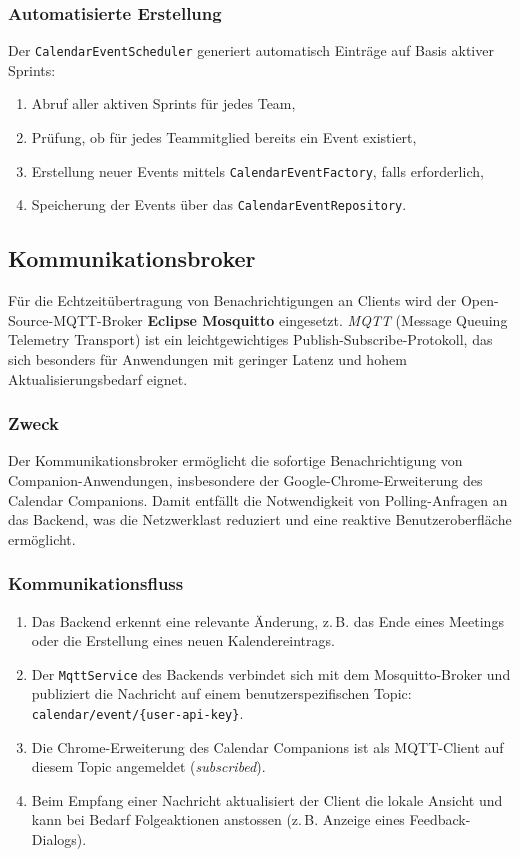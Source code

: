 \documentclass[12pt,a4paper]{report}
\begin{document}
    \subsubsection{Automatisierte Erstellung}
        Der \texttt{CalendarEventScheduler} generiert automatisch Einträge auf Basis aktiver Sprints:
        \begin{enumerate}
            \item Abruf aller aktiven Sprints für jedes Team,
            \item Prüfung, ob für jedes Teammitglied bereits ein Event existiert,
            \item Erstellung neuer Events mittels \texttt{CalendarEventFactory}, falls erforderlich,
            \item Speicherung der Events über das \texttt{CalendarEventRepository}.
        \end{enumerate}

\subsection{Kommunikationsbroker}
        Für die Echtzeitübertragung von Benachrichtigungen an Clients wird der Open-Source-MQTT-Broker \textbf{Eclipse Mosquitto} eingesetzt.
        \textit{MQTT} (Message Queuing Telemetry Transport) ist ein leichtgewichtiges Publish-Subscribe-Protokoll, das sich besonders für Anwendungen mit geringer Latenz und hohem Aktualisierungsbedarf eignet.

    \subsubsection{Zweck}
        Der Kommunikationsbroker ermöglicht die sofortige Benachrichtigung von Companion-Anwendungen, insbesondere der Google-Chrome-Erweiterung des Calendar Companions.
        Damit entfällt die Notwendigkeit von Polling-Anfragen an das Backend, was die Netzwerklast reduziert und eine reaktive Benutzeroberfläche ermöglicht.

    \subsubsection{Kommunikationsfluss}
        \begin{enumerate}
            \item Das Backend erkennt eine relevante Änderung, z.\,B. das Ende eines Meetings oder die Erstellung eines neuen Kalendereintrags.
            \item Der \texttt{MqttService} des Backends verbindet sich mit dem Mosquitto-Broker und publiziert die Nachricht auf einem benutzerspezifischen Topic:
                \texttt{calendar/event/\{user-api-key\}}.
            \item Die Chrome-Erweiterung des Calendar Companions ist als MQTT-Client auf diesem Topic angemeldet (\textit{subscribed}).
            \item Beim Empfang einer Nachricht aktualisiert der Client die lokale Ansicht und kann bei Bedarf Folgeaktionen anstossen (z.\,B. Anzeige eines Feedback-Dialogs).
        \end{enumerate}
\end{document}
